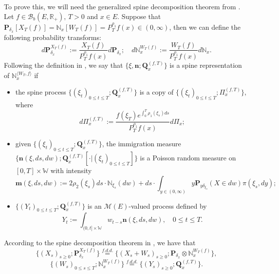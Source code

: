 \documentclass[EJP]{ejpecp} %
\begin{document}
	To prove this, we will need the generalized spine decomposition theorem from \cite{RenSongSun2017Spine}.
	Let $f\in \mathcal B_b(E,\mathbb R_+)$, $T >0$ and $x\in E$.
	Suppose that $\mathbf P_{\delta_x}[X_T(f)] = \mathbb N_x[ W_T(f)] = P^{\rho_1}_T f(x) \in (0,\infty)$, then we can define the following probability transforms:
\[
	d\mathbf P_{\delta_x}^{ X_T(f)}
	:= \frac{X_T(f)}{P_T^{\rho_1} f(x)} d\mathbf P_{\delta_x};
	\quad d\mathbb N_x^{W_T(f)}
	:=  \frac{W_T(f)}{P_T^{\rho_1} f(x)} d\mathbb N_x.
\]
	Following the definition in \cite{RenSongSun2017Spine}, we say that $\{\xi, \mathbf n;\mathbf Q_{x}^{(f,T)}\}$ is a spine representation of $\mathbb N_x^{\langle W_T, f\rangle}$ if
\begin{itemize}
\item
	the spine process $\{(\xi_t)_{0\leq t\leq T}; \mathbf Q^{(f,T)}_x\}$ is a copy of $\{(\xi_t)_{0\leq t\leq T}; \Pi^{(f,T)}_{x}\}$, where
\[
    d\Pi_x^{(f,T)}
    := \frac{f(\xi_T)e^{\int_0^T \rho_1(\xi_s)ds}}{P^{\rho_1}_T f(x)} d \Pi_x;
\]
\item
	given $\{(\xi_t)_{0\leq t\leq T}; \mathbf Q^{(f,T)}_x\}$, the immigration measure $\{\mathbf n(\xi,ds,dw); \mathbf Q^{(f,T)}_x[\cdot |(\xi_t)_{0\leq t\leq T}]\}$ is a Poisson random measure on $[0,T] \times \mathbb W$ with intensity
\begin{equation}
\label{eq: conditional intensity}
 	\mathbf m(\xi,ds,dw)
 	:= 2 \rho_2(\xi_s) ds \cdot \mathbb N_{\xi_s}(dw) + ds \cdot \int_{y\in (0,\infty)} y \mathbf P_{y\delta_{\xi_s}}(X\in dw) \pi(\xi_s,dy);
\end{equation}
\item
	$\{(Y_t)_{0\leq t\leq T}; \mathbf Q^{(f,T)}_x\}$ is an $\mathcal M(E)$-valued process defined by
\[
    Y_t
    := \int_{(0,t] \times \mathbb W} w_{t-s} \mathbf n(\xi,ds,dw),
    \quad 0 \leq t\leq T.
\]
\end{itemize}
	According to the spine decomposition theorem in \cite{RenSongSun2017Spine}, we have that
\begin{equation}
\label{eq: Spine decomposition 1}
	\{(X_s)_{s \geq 0};\mathbf P_{\delta_x}^{X_T(f)}\}
	\overset{f.d.d.}{=} \{(X_s + W_s)_{s \geq 0};\mathbf P_{\delta_x} \otimes \mathbb N_x^{W_T(f)} \},
\end{equation}
\begin{equation}
\label{eq: Spine decomposition 2}
  	\{(W_s)_{0\leq s\leq T};\mathbb N_x^{W_T(f)}\}
	\overset{f.d.d.}{=} \{(Y_s)_{s \geq 0};\mathbf Q_x^{(f,T)}\}.
\end{equation}
\end{document}
